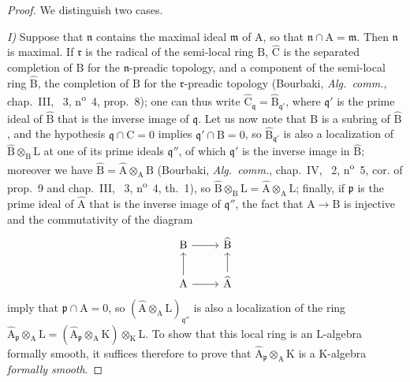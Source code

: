 \begin{proof}
We distinguish two cases.

\emph{I)} Suppose that $\mathfrak{n}$ contains the maximal ideal $\mathfrak{m}$ of $\mathrm{A}$, so that $\mathfrak{n}\cap\mathrm{A}=\mathfrak{m}$.
Then $\mathfrak{n}$ is maximal.
If $\mathfrak{r}$ is the radical of the semi-local ring $\mathrm{B}$, $\widehat{\mathrm{C}}$ is the separated completion of $\mathrm{B}$ for the $\mathfrak{n}$-preadic topology, and a component of the semi-local ring $\widehat{\mathrm{B}}$, the completion of $\mathrm{B}$ for the $\mathfrak{r}$-preadic topology (Bourbaki, \emph{Alg.~comm.}, chap.~III, \textsection~3, n\textsuperscript{o}~4, prop.~8);
one can thus write $\widehat{\mathrm{C}}_\mathfrak{q}=\widehat{\mathrm{B}}_{\mathfrak{q}'}$, where $\mathfrak{q}'$ is the prime ideal of $\widehat{\mathrm{B}}$ that is the inverse image of $\mathfrak{q}$.
Let us now note that $\mathrm{B}$ is a subring of $\widehat{\mathrm{B}}$, and the hypothesis $\mathfrak{q}\cap\mathrm{C}=0$ implies $\mathfrak{q}'\cap\mathrm{B}=0$, so $\widehat{\mathrm{B}}_{\mathfrak{q}'}$ is also a localization of $\widehat{\mathrm{B}}\otimes_\mathrm{B}\mathrm{L}$ at one of its prime ideals $\mathfrak{q}''$, of which $\mathfrak{q}'$ is the inverse image in $\widehat{\mathrm{B}}$;
moreover we have $\widehat{\mathrm{B}}=\widehat{\mathrm{A}}\otimes_\mathrm{A}\mathrm{B}$ (Bourbaki, \emph{Alg.~comm.}, chap.~IV, \textsection~2, n\textsuperscript{o}~5, cor. of prop.~9 and chap.~III, \textsection~3, n\textsuperscript{o}~4, th.~1), so $\widehat{\mathrm{B}}\otimes_\mathrm{B}\mathrm{L}=\widehat{\mathrm{A}}\otimes_\mathrm{A}\mathrm{L}$; finally, if $\mathfrak{p}$ is the prime ideal of $\widehat{\mathrm{A}}$ that is the inverse image of $\mathfrak{q}''$, the fact that $\mathrm{A}\to\mathrm{B}$ is injective and the commutativity of the diagram
\[
  \begin{tikzcd}
    \mathrm{B} \ar[r] & \widehat{\mathrm{B}}\\
    \mathrm{A} \ar[u] \ar[r] & \widehat{\mathrm{A}} \ar[u]
  \end{tikzcd}
\]
imply that $\mathfrak{p}\cap\mathrm{A}=0$, so $(\widehat{\mathrm{A}}\otimes_\mathrm{A}\mathrm{L})_{\mathfrak{q}''}$ is also a localization of the ring $\widehat{\mathrm{A}}_\mathfrak{p}\otimes_\mathrm{A}\mathrm{L}=(\widehat{\mathrm{A}}_\mathfrak{p}\otimes_\mathrm{A}\mathrm{K})\otimes_\mathrm{K}\mathrm{L}$.
To show that this local ring is an $\mathrm{L}$-algebra formally smooth, it suffices therefore to prove that $\widehat{\mathrm{A}}_\mathfrak{p}\otimes_\mathrm{A}\mathrm{K}$ is a $\mathrm{K}$-algebra \emph{formally smooth}.

\end{proof}
